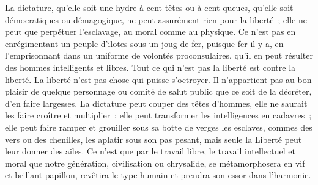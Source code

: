 \documentclass[french,twoside]{book} %
\begin{document}
La dictature, qu’elle soit une hydre à cent têtes ou à cent queues, qu’elle soit démocratiques ou démagogique, ne peut assurément rien pour la liberté ; elle ne peut que perpétuer l’esclavage, au moral comme au physique. Ce n’est pas en enrégimentant un peuple d’ilotes sous un joug de fer, puisque fer il y a, en l’emprisonnant dans un uniforme de volontés proconsulaires, qu’il en peut résulter des hommes intelligents et libres. Tout ce qui n’est pas la liberté est contre la liberté. La liberté n’est pas chose qui puisse s’octroyer. Il n’appartient pas au bon plaisir de quelque personnage ou comité de salut public que ce soit de la décréter, d’en faire largesses. La dictature peut couper des têtes d’hommes, elle ne saurait les faire croître et multiplier ; elle peut transformer les intelligences en cadavres ; elle peut faire ramper et grouiller sous sa botte de verges les esclaves, commes des vers ou des chenilles, les aplatir sous son pas pesant, mais seule la Liberté peut leur donner des ailes. Ce n’est que par le travail libre, le travail intellectuel et moral que notre génération, civilisation ou chrysalide, se métamorphosera en vif et brillant papillon, revêtira le type humain et prendra son essor dans l’harmonie.\par
\end{document}
